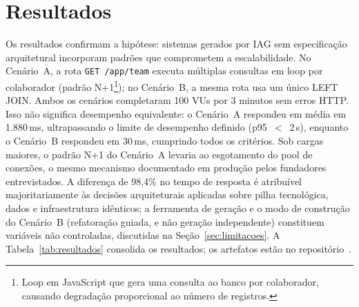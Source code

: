 \documentclass[sigconf]{acmart}
\begin{document}
\section{Resultados}

Os resultados confirmam a hipótese: sistemas gerados por IAG sem especificação
arquitetural incorporam padrões que comprometem a escalabilidade. No Cenário~A,
a rota \texttt{GET /app/team} executa múltiplas consultas em loop por colaborador
(padrão N+1\footnote{Loop em JavaScript que gera uma consulta ao banco por colaborador, causando degradação proporcional ao número de registros.}); no Cenário~B, a mesma rota usa um único LEFT JOIN.
Ambos os cenários completaram 100 VUs por 3 minutos sem erros HTTP. Isso não
significa desempenho equivalente: o Cenário~A respondeu em média em 1.880\,ms,
ultrapassando o limite de desempenho definido (p95~$<$~2\,s), enquanto o
Cenário~B respondeu em 30\,ms, cumprindo todos os critérios. Sob cargas maiores, o
padrão N+1 do Cenário~A levaria ao esgotamento do pool de conexões, o mesmo
mecanismo documentado em produção pelos fundadores entrevistados. A diferença de
98,4\% no tempo de resposta é atribuível majoritariamente às decisões arquiteturais
aplicadas sobre pilha tecnológica, dados e infraestrutura idênticos; a ferramenta de
geração e o modo de construção do Cenário~B (refatoração guiada, e não geração
independente) constituem variáveis não controladas, discutidas na Seção~\ref{sec:limitacoes}.
A Tabela~\ref{tab:resultados} consolida os resultados; os artefatos estão no
repositório~\cite{GenAIDebt2026}.
\end{document}
